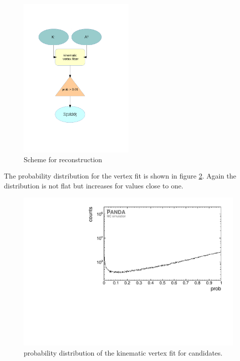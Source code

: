 		\begin{figure}
			\centering
				\includegraphics[width=0.50\textwidth]{./plots/combineExcitedCascade.pdf}
			\caption{\propose Scheme for \excitedcascade reconstruction}
			\label{fig:excitedcascade_scheme}
		\end{figure}
		
		
		The probability distribution for the vertex fit is shown in figure \ref{fig:xi1820_prob}.
		Again the distribution is not flat but increases for values close to one. 
		
		\begin{figure}
			\centering
			\includegraphics[width=1.\textwidth]{./plots/Xi1820/XiMinus1820_prob.pdf}
			\caption{\propose probability distribution of the kinematic vertex fit for \excitedcascade candidates.}
			\label{fig:xi1820_prob}
		\end{figure}
		
